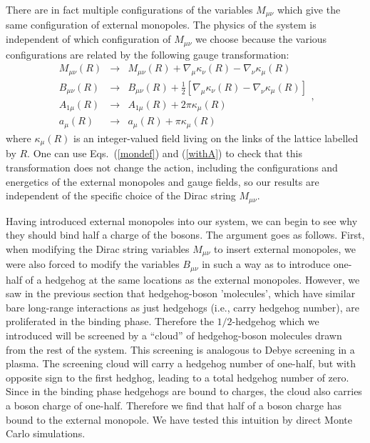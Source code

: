 There are in fact multiple configurations of the variables $M_{\mu\nu}$ which give the same configuration of external monopoles. The physics of the system is independent of which configuration of $M_{\mu\nu}$ we choose because the various configurations are related by the following gauge transformation:
\begin{equation}
\begin{array}{ccc}
M_{\mu\nu}(R)&\rightarrow&M_{\mu\nu}(R)+\nabla_\mu \kappa_\nu(R)-\nabla_\nu \kappa_\mu(R) \\
B_{\mu\nu}(R)&\rightarrow&B_{\mu\nu}(R)+\frac{1}{2}[\nabla_\mu \kappa_\nu(R)-\nabla_\nu \kappa_\mu(R)] \\
A_{1\mu}(R)&\rightarrow&A_{1\mu}(R)+2\pi \kappa_\mu(R)\\
a_\mu(R)&\rightarrow&a_\mu(R)+\pi \kappa_\mu(R)
\end{array},
\end{equation}
where $\kappa_\mu(R)$ is an integer-valued field living on the links of the lattice labelled by $R$. One can use Eqs.~(\ref{mondef}) and (\ref{withA}) to check that this transformation does not change the action, 
including the configurations and energetics of the external monopoles and gauge fields, so our results are independent of the specific choice of the Dirac string $M_{\mu\nu}$. 

Having introduced external monopoles into our system, we can begin to see why they should bind half a charge of the bosons. 
The argument goes as follows. First, when modifying the Dirac string variables $M_{\mu\nu}$ to insert external monopoles, we were also forced to modify the variables $B_{\mu\nu}$ in such a way as to introduce one-half of a hedgehog at the same locations as the external monopoles. However, we saw in the previous section that hedgehog-boson 'molecules', which have similar bare long-range interactions as just hedgehogs (i.e., carry hedgehog number), are proliferated in the binding phase. Therefore the $1/2$-hedgehog which we introduced will be screened by a ``cloud'' of hedgehog-boson molecules drawn from the rest of the system. This screening is analogous to Debye screening in a plasma. The screening cloud will carry a hedgehog number of one-half, but with opposite sign to the first hedghog, leading to a total hedgehog number of zero. Since in the binding phase hedgehogs are bound to charges, the cloud also carries a boson charge of one-half. Therefore we find that half of a boson charge has bound to the external monopole. We have tested this intuition by direct Monte Carlo simulations.

